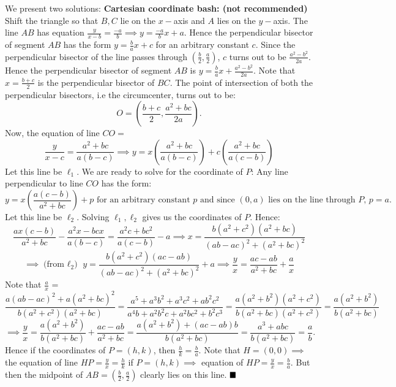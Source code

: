 \documentclass[fontsize=9pt]{scrartcl}
\begin{document}
We present two solutions: \newline
\textbf{Cartesian coordinate bash: (not recommended)} \newline
Shift the triangle so that $B,C$ lie on the $x-$axis and $A$ lies
on the $y-$axis.
The line $AB$ has equation $\frac{y}{x-b} = \frac{-a}{b} \implies y=\frac{-a}{b}x+a$.
Hence the perpendicular bisector of segment $AB$ has the form
$y = \frac{b}ax + c$ for an arbitrary constant $c$. Since the perpendicular bisector 
of the line passes through $(\frac{b}2, \frac{a}2)$, $c$ turns out to be $\frac{a^2-b^2}{2a}$. \newline
Hence the perpendicular bisector of segment $AB$ is $y = \frac{b}ax + \frac{a^2-b^2}{2a}$.
Note that $x = \frac{b+c}{2}$ is the perpendicular bisector of $BC$.
The point of intersection of both the perpendicular bisectors, i.e the circumcenter,
turns out to be: \[O = \left(\frac{b+c}{2}, \frac{a^2+bc}{2a}\right).\]
Now, the equation of line $CO = $ \[\frac{y}{x-c} = \frac{a^2+bc}{a(b-c)} \implies y = x \left(\frac{a^2+bc}{a(b-c)} \right) + c \left(\frac{a^2 + bc}{a(c-b)} \right)\]
Let this line be $\ell_1$.
We are ready to solve for the coordinate of $P$: \newline
Any line perpendicular to line $CO$ has the form: \[y = x\left( \frac{a(c-b)}{a^2 + bc} \right) + p \text{ for an arbitrary constant $p$ and since $(0,a)$ lies on the line through $P$, $p=a$. }\]
Let this line be $\ell_2$. Solving $\ell_1,\ell_2$ gives us the coordinates of $P$. Hence:
\[\frac{ax(c-b)}{a^2+bc}-\frac{a^2x-bcx}{a(b-c)} = \frac{a^2c+bc^2}{a(c-b)} - a \implies x = \frac{b(a^2+c^2)(a^2+bc)}{(ab-ac)^2+(a^2+bc)^2}\]
\[\implies \text{(from $\ell_2$) } y = \frac{b(a^2+c^2)(ac - ab)}{(ab-ac)^2+(a^2+bc)^2} + a \implies \frac yx = \frac{ac-ab}{a^2 + bc} + \frac ax\]
Note that $\frac ax$ = \[\frac{a(ab-ac)^2+a(a^2+bc)^2}{b(a^2+c^2)(a^2+bc)} = \frac{a^5+a^3b^2+a^3c^2+ab^2c^2}{a^4b+a^2b^2c+a^2bc^2+b^2c^3} =\frac{a\left(a^2+b^2\right)\left(a^2+c^2\right)}{b\left(a^2+bc\right)\left(a^2+c^2\right)}  =\frac{a\left(a^2+b^2\right)}{b\left(a^2+bc\right)}\]
\[\implies \frac yx = \frac{a\left(a^2+b^2\right)}{b\left(a^2+bc\right)} + \frac{ac-ab}{a^2+bc} =\frac{a\left(a^2+b^2\right)+\left(ac-ab\right)b}{b\left(a^2+bc\right)} =\frac{a^3+abc}{b\left(a^2+bc\right)} = \frac ab.\]
Hence if the coordinates of $P = (h,k)$, then $\frac hk = \frac ba$. Note that $H = (0,0) \implies$ the equation
of line $HP = \frac yx=\frac hk$ if $P = (h,k) \implies $ equation of $HP=\frac yx = \frac ba$. But then the midpoint of
$AB = \left(\frac b2, \frac a2 \right)$ clearly lies on this line.  $\hfill \blacksquare$ \newline \newline
\end{document}
